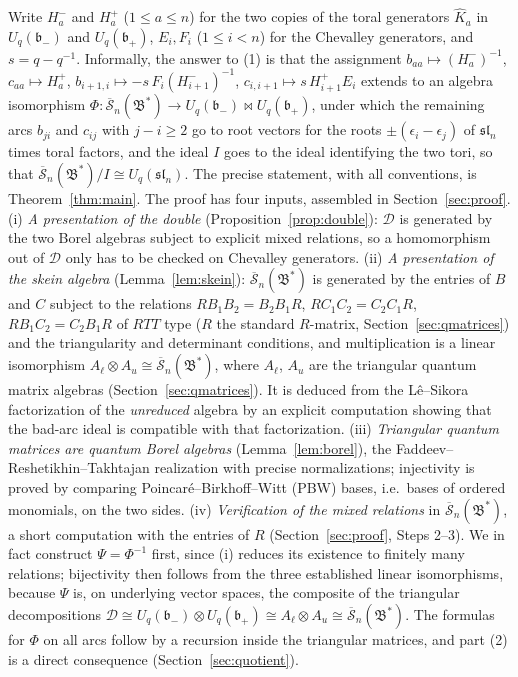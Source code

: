 \documentclass[12pt]{article}
\theoremstyle{remark}
\newcommand{\U}{U_q}
\newcommand{\slN}{\mathfrak{sl}_n}
\newcommand{\bp}{\mathfrak b_+}
\newcommand{\bm}{\mathfrak b_-}
\newcommand{\redS}{\overline{\mathcal S}_n}
\newcommand{\Bstar}{\mathfrak B^*}
\newcommand{\ot}{\otimes}
\newcommand{\cD}{\mathcal D}
\begin{document}
Write $H^-_a$ and $H^+_a$ ($1\le a\le n$) for the two copies of the
toral generators $\hat K_a$ in $\U(\bm)$ and $\U(\bp)$, $E_i,F_i$
($1\le i<n$) for the Chevalley generators, and $s=q-q^{-1}$.
Informally, the answer to (1) is that the assignment
$b_{aa}\mapsto(H^-_a)^{-1}$, $c_{aa}\mapsto H^+_a$,
$b_{i+1,i}\mapsto -s\,F_i(H^-_{i+1})^{-1}$,
$c_{i,i+1}\mapsto s\,H^+_{i+1}E_i$
extends to an algebra isomorphism
$\Phi:\redS(\Bstar)\to\U(\bm)\bowtie\U(\bp)$, under which the remaining
arcs $b_{ji}$ and $c_{ij}$ with $j-i\ge2$ go to root vectors for the
roots $\pm(\epsilon_i-\epsilon_j)$ of $\slN$ times toral factors, and
the ideal $I$ goes to the ideal identifying the two tori, so that
$\redS(\Bstar)/I\cong\U(\slN)$. The precise statement, with all
conventions, is Theorem~\ref{thm:main}.
The proof has four inputs, assembled in Section~\ref{sec:proof}.
(i) \emph{A presentation of the double} (Proposition~\ref{prop:double}):
$\cD$ is generated by the two Borel algebras subject to explicit mixed
relations, so a homomorphism out of $\cD$ only has to be checked on
Chevalley generators.
(ii) \emph{A presentation of the skein algebra} (Lemma~\ref{lem:skein}):
$\redS(\Bstar)$ is generated by the entries of $B$ and $C$ subject to
the relations $RB_1B_2=B_2B_1R$, $RC_1C_2=C_2C_1R$, $RB_1C_2=C_2B_1R$
of $RTT$ type ($R$ the standard $R$-matrix, Section~\ref{sec:qmatrices})
and the triangularity and determinant conditions, and multiplication is a
linear isomorphism $A_\ell\ot A_u\cong\redS(\Bstar)$, where $A_\ell$,
$A_u$ are the triangular quantum matrix algebras
(Section~\ref{sec:qmatrices}). It is deduced from the L\^e--Sikora
factorization \cite{LS} of the \emph{unreduced} algebra by an explicit
computation showing that the bad-arc ideal is compatible with that
factorization.
(iii) \emph{Triangular quantum matrices are quantum Borel algebras}
(Lemma~\ref{lem:borel}), the Faddeev--Reshetikhin--Takhtajan realization
\cite{FRT} with precise normalizations; injectivity is proved by
comparing Poincar\'e--Birkhoff--Witt (PBW) bases, i.e.\ bases of
ordered monomials, on the two sides.
(iv) \emph{Verification of the mixed relations} in $\redS(\Bstar)$, a
short computation with the entries of $R$ (Section~\ref{sec:proof},
Steps 2--3).
We in fact construct $\Psi=\Phi^{-1}$ first, since (i) reduces its
existence to finitely many relations; bijectivity then follows from
the three established linear isomorphisms, because $\Psi$ is, on
underlying vector spaces, the composite of the triangular
decompositions $\cD\cong\U(\bm)\ot\U(\bp)\cong
A_\ell\ot A_u\cong\redS(\Bstar)$. The formulas for $\Phi$ on all arcs
follow by a recursion inside the triangular matrices, and part (2) is a
direct consequence (Section~\ref{sec:quotient}).
\end{document}

